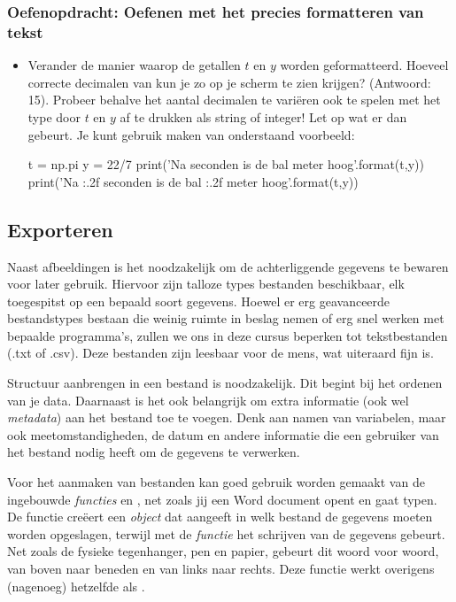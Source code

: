 \documentclass[a4paper,11pt, fleqn]{article}
\begin{document}
\subsubsection*{Oefenopdracht: Oefenen met het precies formatteren van tekst}
\begin{itemize}
\item
Verander de manier waarop de getallen $t$ en $y$ worden geformatteerd. 
Hoeveel correcte decimalen van  kun je zo op je scherm te zien krijgen? 
(Antwoord: 15). 
Probeer behalve het aantal decimalen te vari\"eren ook te spelen met het type door $t$ en $y$ af te drukken als string of integer! 
Let op wat er dan gebeurt. Je kunt gebruik maken van onderstaand voorbeeld:
\begin{python}
t = np.pi
y = 22/7
print('Na {} seconden is de bal {} meter hoog'.format(t,y))
print('Na {:.2f} seconden is de bal {:.2f} meter hoog'.format(t,y))
\end{python}
\end{itemize}

\subsection{Exporteren}

Naast afbeeldingen is het noodzakelijk om de achterliggende gegevens te bewaren voor later gebruik. Hiervoor zijn talloze types bestanden beschikbaar, elk toegespitst op een bepaald soort gegevens. Hoewel er erg geavanceerde bestandstypes bestaan die weinig ruimte in beslag nemen of erg snel werken met bepaalde programma's, zullen we ons in deze cursus beperken tot tekstbestanden (.txt of .csv). Deze bestanden zijn leesbaar voor de mens, wat uiteraard fijn is.

Structuur aanbrengen in een bestand is noodzakelijk. Dit begint bij het ordenen van je data. Daarnaast is het ook belangrijk om extra informatie (ook wel \textit{metadata}) aan het bestand toe te voegen. Denk aan namen van variabelen, maar ook meetomstandigheden, de datum en andere informatie die een gebruiker van het bestand nodig heeft om de gegevens te verwerken.

Voor het aanmaken van bestanden kan goed gebruik worden gemaakt van de ingebouwde \textit{functies}  en , net zoals jij een Word document opent en gaat typen. De functie  cre\"eert een \textit{object} dat aangeeft in welk bestand de gegevens moeten worden opgeslagen, terwijl met de \textit{functie}  het schrijven van de gegevens gebeurt. Net zoals de fysieke tegenhanger, pen en papier, gebeurt dit woord voor woord, van boven naar beneden en van links naar rechts. Deze functie  werkt overigens (nagenoeg) hetzelfde als .
\end{document}
